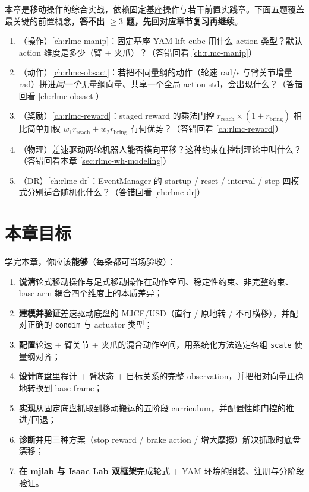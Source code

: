 本章是移动操作的综合实战，依赖固定基座操作与若干前置实践章。下面五题覆盖最关键的前置概念，\textbf{答不出 $\ge 3$ 题，先回对应章节复习再继续}。

\begin{practice}[开课前自测]
\begin{enumerate}
\item （操作）\cref{ch:rlmc-manip}：固定基座 YAM lift cube 用什么 action 类型？默认 action 维度是多少（臂 + 夹爪）？（答错回看 \cref{ch:rlmc-manip}）
\item （动作）\cref{ch:rlmc-obsact}：若把不同量纲的动作（轮速 rad/s 与臂关节增量 rad）拼进\emph{同一个}无量纲向量、共享一个全局 action std，会出现什么？（答错回看 \cref{ch:rlmc-obsact}）
\item （奖励）\cref{ch:rlmc-reward}：staged reward 的乘法门控 $r_{\text{reach}}\times(1+r_{\text{bring}})$ 相比简单加权 $w_1 r_{\text{reach}}+w_2 r_{\text{bring}}$ 有何优势？（答错回看 \cref{ch:rlmc-reward}）
\item （物理）差速驱动两轮机器人能否横向平移？这种约束在控制理论中叫什么？（答错回看本章 \cref{sec:rlmc-wh-modeling}）
\item （DR）\cref{ch:rlmc-dr}：EventManager 的 startup / reset / interval / step 四模式分别适合随机化什么？（答错回看 \cref{ch:rlmc-dr}）
\end{enumerate}
\end{practice}

\section{本章目标}
\label{sec:rlmc-wh-goals}

学完本章，你应该\textbf{能够}（每条都可当场验收）：

\begin{enumerate}
\item \textbf{说清}轮式移动操作与足式移动操作在动作空间、稳定性约束、非完整约束、base-arm 耦合四个维度上的本质差异；
\item \textbf{建模并验证}差速驱动底盘的 MJCF/USD（直行 / 原地转 / 不可横移），并配对正确的 \verb|condim| 与 actuator 类型；
\item \textbf{配置}轮速 + 臂关节 + 夹爪的混合动作空间，用系统化方法选定各组 \verb|scale| 使量纲对齐；
\item \textbf{设计}底盘里程计 + 臂状态 + 目标关系的完整 observation，并把相对向量正确地转换到 base frame；
\item \textbf{实现}从固定底盘抓取到移动搬运的五阶段 curriculum，并配置性能门控的推进/回退；
\item \textbf{诊断}并用三种方案（stop reward / brake action / 增大摩擦）解决抓取时底盘漂移；
\item \textbf{在 mjlab 与 Isaac Lab 双框架}完成轮式 + YAM 环境的组装、注册与分阶段验证。
\end{enumerate}


